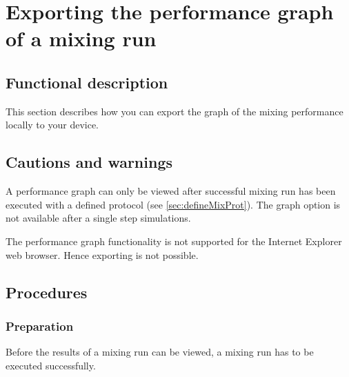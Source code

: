 
\section{Exporting the performance graph of a mixing run}
\label{sec:exportSingleGraph}

\subsection{Functional description}
This section describes how you can export the graph of the mixing performance locally to your device.

\subsection{Cautions and warnings}
A performance graph can only be viewed after successful mixing run has been executed with a defined protocol (see \ref{sec:defineMixProt}). The graph option is not available after a single step simulations.

The performance graph functionality is not supported for the Internet Explorer web browser. Hence exporting is not possible.

\subsection{Procedures}
\subsubsection{Preparation}
Before the results of a mixing run can be viewed, a mixing run has to be executed successfully.

